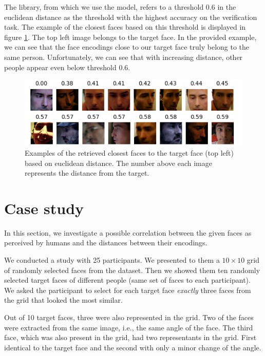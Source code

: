 The library, from which we use the model, refers to a threshold 0.6 in the euclidean distance as the threshold with the highest accuracy on the verification task. The example of the closest faces based on this threshold is displayed in figure \ref{fig:closest_faces}. The top left image belongs to the target face. In the provided example, we can see that the face encodings close to our target face truly belong to the same person. Unfortunately, we can see that with increasing distance, other people appear even below threshold 0.6.


\begin{figure}
    \centering
    \includegraphics[width=\linewidth]{img/man_closest_faces.pdf}
    \caption[Examples of the retrieved closest faces to the target face based on euclidean distance]{Examples of the retrieved closest faces to the target face (top left) based on euclidean distance. The number above each image represents the distance from the target.}
    \label{fig:closest_faces}
\end{figure}

\section{Case study}
\label{s:case_study}

In this section, we investigate a possible correlation between the given faces as perceived by humans and the distances between their encodings.

We conducted a study with 25 participants. We presented to them a $10\times10$ grid of randomly selected faces from the dataset. 
Then we showed them ten randomly selected target faces of different people (same set of faces to each participant). We asked the participant to select for each target face \emph{exactly} three faces from the grid that looked the most similar. 

Out of 10 target faces, three were also represented in the grid. Two of the faces were extracted from the same image, i.e., the same angle of the face. The third face, which was also present in the grid, had two representants in the grid. First identical to the target face and the second with only a minor change of the angle.

